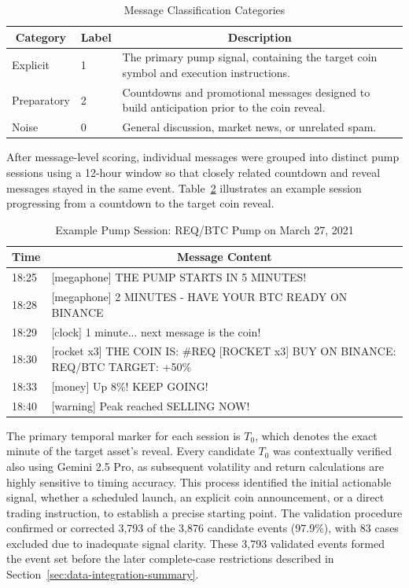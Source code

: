 \begin{table}[H]
\centering
\caption{Message Classification Categories}
\label{tab:message-categories}
\begin{tabular}{|l|l|p{8.5cm}|}
\toprule
\multicolumn{1}{|c|}{\textbf{Category}} & \multicolumn{1}{c|}{\textbf{Label}} & \multicolumn{1}{c|}{\textbf{Description}} \\
\midrule
Explicit & 1 & The primary pump signal, containing the target coin symbol and execution instructions. \\
Preparatory & 2 & Countdowns and promotional messages designed to build anticipation prior to the coin reveal. \\
Noise & 0 & General discussion, market news, or unrelated spam. \\
\bottomrule
\end{tabular}
\ownsource
\end{table}



After message-level scoring, individual messages were grouped into distinct pump sessions using a 12-hour window so that closely related countdown and reveal messages stayed in the same event. Table~\ref{tab:session-example} illustrates an example session progressing from a countdown to the target coin reveal.

\begin{table}[H]
\centering
\caption{Example Pump Session: REQ/BTC Pump on March 27, 2021}
\label{tab:session-example}
\begin{tabular}{|l|p{10cm}|}
\toprule
\multicolumn{1}{|c|}{\textbf{Time}} & \multicolumn{1}{c|}{\textbf{Message Content}} \\
\midrule
18:25 & [megaphone] THE PUMP STARTS IN 5 MINUTES! \\
18:28 & [megaphone] 2 MINUTES - HAVE YOUR BTC READY ON BINANCE \\
18:29 & [clock] 1 minute... next message is the coin! \\
18:30 & [rocket x3] THE COIN IS: \#REQ [ROCKET x3] BUY ON BINANCE: REQ/BTC TARGET: +50\% \\
18:33 & [money] Up 8\%! KEEP GOING! \\
18:40 & [warning] Peak reached SELLING NOW! \\
\bottomrule
\end{tabular}
\datasetsource
\end{table}

The primary temporal marker for each session is $T_0$, which denotes the exact minute of the target asset's reveal. Every candidate $T_0$ was contextually verified also using Gemini 2.5 Pro, as subsequent volatility and return calculations are highly sensitive to timing accuracy. This process identified the initial actionable signal, whether a scheduled launch, an explicit coin announcement, or a direct trading instruction, to establish a precise starting point. The validation procedure confirmed or corrected 3,793 of the 3,876 candidate events (97.9\%), with 83 cases excluded due to inadequate signal clarity. These 3,793 validated events formed the event set before the later complete-case restrictions described in Section~\ref{sec:data-integration-summary}.

